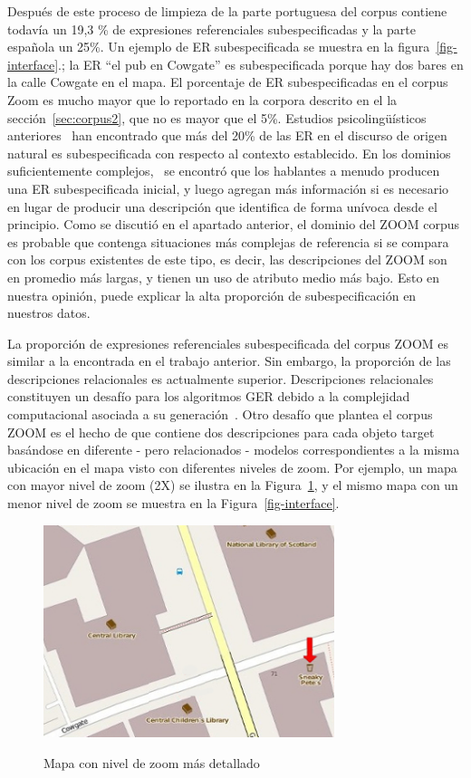 Despu\'es de este proceso de limpieza de la parte portuguesa del corpus contiene todav\'{i}a un 19,3 \% de expresiones referenciales subespecificadas y la parte espa\~nola un 25\%. Un ejemplo de ER subespecificada se muestra en la figura~\ref{fig-interface}.; la ER ``el pub en Cowgate'' es subespecificada porque hay dos bares en la calle Cowgate en el mapa. El porcentaje de ER subespecificadas en el corpus Zoom es mucho mayor que lo reportado en la corpora descrito en el la secci\'on~\ref{sec:corpus2}, que no es mayor que el 5\%. Estudios psicoling\"u\'{i}sticos anteriores~\cite{Clark1986} han encontrado que m\'as del 20\% de las ER en el discurso de origen natural es subespecificada con respecto al contexto establecido. En los dominios suficientemente complejos,~\cite{Clark1986} se encontr\'o que los hablantes a menudo producen una ER subespecificada inicial, y luego agregan m\'as informaci\'on si es necesario en lugar de producir una descripci\'on que identifica de forma un\'{i}voca desde el principio. Como se discuti\'o en el apartado anterior, el dominio del ZOOM corpus es probable que contenga situaciones m\'as complejas de referencia si se compara con los corpus existentes de este tipo, es decir, las descripciones del ZOOM son en promedio m\'as largas, y tienen un uso de atributo medio m\'as bajo. Esto en nuestra opini\'on, puede explicar la alta proporci\'on de subespecificaci\'on en nuestros datos.

La proporci\'on de expresiones referenciales subespecificada del corpus ZOOM es similar a la encontrada en el trabajo anterior. Sin embargo, la proporci\'on de las descripciones relacionales es actualmente superior. Descripciones relacionales constituyen un desaf\'{i}o para los algoritmos GER debido a la complejidad computacional asociada a su generaci\'on~\cite{survey}. Otro desaf\'{i}o que plantea el corpus ZOOM es el hecho de que contiene dos descripciones para cada objeto target bas\'andose en diferente - pero relacionados - modelos correspondientes a la misma ubicaci\'on en el mapa visto con diferentes niveles de zoom. Por ejemplo, un mapa con mayor nivel de zoom (2X) se ilustra en la Figura~\ref{fig-with-zoom}, y el mismo mapa con un menor nivel de zoom se muestra en la Figura~\ref{fig-interface}.

\begin{figure}[ht]
\begin{center}
\includegraphics[width=8.5cm]{figures/with-zoom.jpg}\\[0pt]
\caption{Mapa con nivel de zoom m\'as detallado}
\label{fig-with-zoom}
\end{center}
\end{figure}

